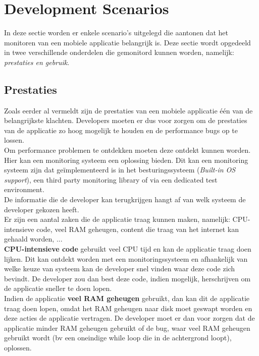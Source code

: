 \section{Development Scenarios}
In deze sectie worden er enkele scenario's uitgelegd die aantonen dat het monitoren van een mobiele applicatie belangrijk is. Deze sectie wordt opgedeeld in twee verschillende onderdelen die gemonitord kunnen worden, namelijk: \textit{prestaties en gebruik}.

\subsection{Prestaties}
Zoals eerder al vermeldt zijn de prestaties van een mobiele applicatie \'e\'en van de belangrijkste klachten. Developers moeten er dus voor zorgen om de prestaties van de applicatie zo hoog mogelijk te houden en de performance bugs op te lossen. \\

Om performance problemen te ontdekken moeten deze ontdekt kunnen worden. Hier kan een monitoring systeem een oplossing bieden. Dit kan een monitoring systeem zijn dat ge\"implementeerd is in het besturingssysteem (\textit{Built-in OS support}), een third party monitoring library of via een dedicated test environment.  \\
De informatie die de developer kan terugkrijgen hangt af van welk systeem de developer gekozen heeft.\\

Er zijn een aantal zaken die de applicatie traag kunnen maken, namelijk: CPU-intensieve code, veel RAM geheugen, content die traag van het internet kan gehaald worden, ... \\

\textbf{CPU-intensieve code} gebruikt veel CPU tijd en kan de applicatie traag doen lijken. Dit kan ontdekt worden met een monitoringssysteem en afhankelijk van welke keuze van systeem kan de developer snel vinden waar deze code zich bevindt. De developer zou dan best deze code, indien mogelijk, herschrijven om de applicatie sneller te doen lopen. \\

Indien de applicatie \textbf{veel RAM geheugen} gebruikt, dan kan dit de applicatie traag doen lopen, omdat het RAM geheugen naar disk moet geswapt worden en deze acties de applicatie vertragen. De developer moet er dan voor zorgen dat de applicatie minder RAM geheugen gebruikt of de bug, waar veel RAM geheugen gebruikt wordt (bv een oneindige while loop die in de achtergrond loopt), oplossen. \\

